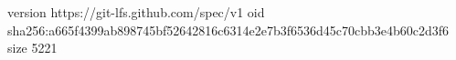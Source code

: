 version https://git-lfs.github.com/spec/v1
oid sha256:a665f4399ab898745bf52642816c6314e2e7b3f6536d45c70cbb3e4b60c2d3f6
size 5221
